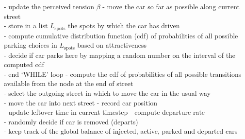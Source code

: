 \documentclass[trsc,reprint]{informs3}
\begin{document}
\begin{APPENDICES}
\begin{algorithm}[h]
\begin{algorithmic}
    
    \STATE
         - update the perceived tension $\beta$
         \STATE
            - move the car so far as possible along current street\\
            - store in a list $L_\mathrm{spots}$ the spots by which the car has driven\\
            - compute cumulative distribution function (cdf) of probabilities of all possible parking choices in $L_\mathrm{spots}$ based on attractiveness\\
            \STATE
                - decide if car parks here by mapping a random number on the interval of the computed cdf\\
                \STATE
                    - end `WHILE' loop
                \ENDIF
            \ENDFOR
            \STATE
                    - compute the cdf of probabilities of all possible transitions available from the node at the end of street\\
                    - select the outgoing street in which to move the car in the usual way\\
                    - move the car into next street
            \ENDIF
            \STATE
            - record car position\\
            - update leftover time in current timestep
         \ENDWHILE
    \ENDFOR
    \STATE
        - compute departure rate\\
        - randomly decide if car is removed (departs)
    \ENDFOR\\
    
    - keep track of the global balance of injected, active, parked and departed cars
\ENDFOR

\end{algorithmic}
\end{algorithm}




 \end{APPENDICES}

\clearpage
\end{document}
